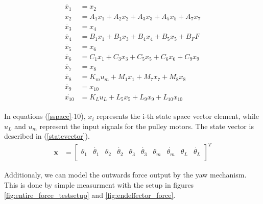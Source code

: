 \begin{gather}\label{sspace}
\begin{align} 
\dot{x_1} &= x_2\\
\dot{x_2} &= A_1x_1 + A_2x_2 + A_3x_3 + A_5x_5 + A_7x_7\\
\dot{x_3} &= x_4\\
\dot{x_4} &= B_1x_1 + B_3x_3 + B_4x_4 + B_5x_5 + B_FF\\
\dot{x_5} &= x_6\\
\dot{x_6} &= C_1x_1 + C_3x_3 + C_5x_5 + C_6x_6 + C_9x_9\\
\dot{x_7} &= x_8\\
\dot{x_8} &= K_mu_m + M_1x_1 + M_7x_7 + M_8x_8\\
\dot{x_9} &= x_{10}\\
\dot{x_{10}} &= K_Lu_L + L_5x_5 + L_9x_9 + L_{10}x_{10}
\end{align}
\end{gather}

In equations (\ref{sspace}-10), $x_i$ represents the i-th state space vector element, while $u_L$ and $u_m$ represent the input signals for the pulley motors. 
The state vector is described in (\ref{statevector}).
\begin{align} \label{statevector}
\mathbf{x} &= 
\begin{bmatrix}
\theta_1 &\dot{\theta_1} &\theta_2 &\dot{\theta_2} &\theta_3 &\dot{\theta_3} &\theta_m &\dot{\theta_m} &\theta_L &\dot{\theta_L} \\
\end{bmatrix}^T
\end{align}

Additionaly, we can model the outwards force output by the yaw mechanism.
This is done by simple measurment with the setup in figures \ref{fig:entire_force_testsetup} and \ref{fig:endeffector_force}.


